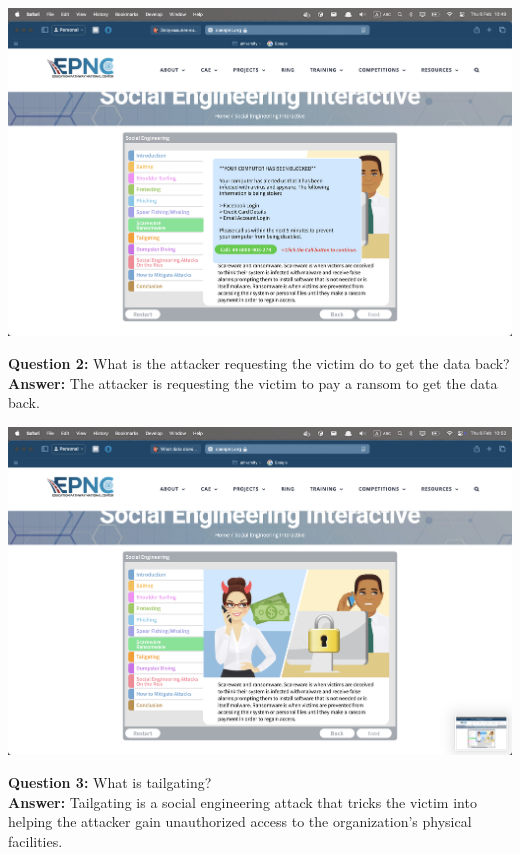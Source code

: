 \documentclass{article}
\begin{document}
\vspace{1\baselineskip}

\includegraphics[width=1\textwidth]{5.png}

\newpage

\vspace{1\baselineskip}

\textbf{Question 2: } What is the attacker requesting the victim do to get the data back? \\
\textbf{Answer: } The attacker is requesting the victim to pay a ransom to get the data back. \\

\vspace{1\baselineskip}

\includegraphics[width=1\textwidth]{6.png}

\vspace{1\baselineskip}

\textbf{Question 3: } What is tailgating? \\
\textbf{Answer: } Tailgating is a social engineering attack that tricks the victim into helping the attacker gain unauthorized access to the organization's physical facilities. \\
\end{document}

